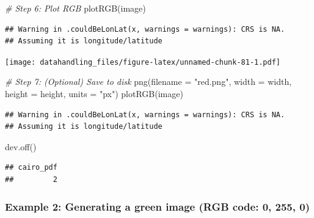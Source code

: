 \documentclass[
  12pt,
]{style/krantz}
\newenvironment{Shaded}{\begin{snugshade}}{\end{snugshade}}
\newcommand{\AttributeTok}[1]{\textcolor[rgb]{0.77,0.63,0.00}{#1}}
\newcommand{\CommentTok}[1]{\textcolor[rgb]{0.56,0.35,0.01}{\textit{#1}}}
\newcommand{\FunctionTok}[1]{\textcolor[rgb]{0.00,0.00,0.00}{#1}}
\newcommand{\NormalTok}[1]{#1}
\newcommand{\StringTok}[1]{\textcolor[rgb]{0.31,0.60,0.02}{#1}}
\begin{document}
\begin{Shaded}
\begin{Highlighting}[]
\CommentTok{\# Step 6: Plot RGB}
\FunctionTok{plotRGB}\NormalTok{(image)}
\end{Highlighting}
\end{Shaded}

\begin{verbatim}
## Warning in .couldBeLonLat(x, warnings = warnings): CRS is NA.
## Assuming it is longitude/latitude
\end{verbatim}

\texttt{[image: datahandling\_files/figure-latex/unnamed-chunk-81-1.pdf]}

\begin{Shaded}
\begin{Highlighting}[]
\CommentTok{\# Step 7: (Optional) Save to disk}
\FunctionTok{png}\NormalTok{(}\AttributeTok{filename =} \StringTok{"red.png"}\NormalTok{, }\AttributeTok{width =}\NormalTok{ width, }\AttributeTok{height =}\NormalTok{ height, }\AttributeTok{units =} \StringTok{"px"}\NormalTok{)}
\FunctionTok{plotRGB}\NormalTok{(image)}
\end{Highlighting}
\end{Shaded}

\begin{verbatim}
## Warning in .couldBeLonLat(x, warnings = warnings): CRS is NA.
## Assuming it is longitude/latitude
\end{verbatim}

\begin{Shaded}
\begin{Highlighting}[]
\FunctionTok{dev.off}\NormalTok{()}
\end{Highlighting}
\end{Shaded}

\begin{verbatim}
## cairo_pdf 
##         2
\end{verbatim}

\hypertarget{example-2-generating-a-green-image-rgb-code-0-255-0}{%
\subsubsection{Example 2: Generating a green image (RGB code: 0, 255, 0)}\label{example-2-generating-a-green-image-rgb-code-0-255-0}}
\end{document}
